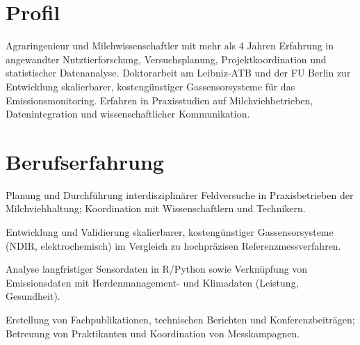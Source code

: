 \documentclass[10pt,a4paper]{article}
\begin{document}

\section*{Profil}
Agraringenieur und Milchwissenschaftler mit mehr als 4 Jahren Erfahrung in angewandter Nutztierforschung, Versuchsplanung, Projektkoordination und statistischer Datenanalyse. Doktorarbeit am Leibniz-ATB und der FU Berlin zur Entwicklung skalierbarer, kostengünstiger Gassensorsysteme für das Emissionsmonitoring. Erfahren in Praxisstudien auf Milchviehbetrieben, Datenintegration und wissenschaftlicher Kommunikation.

\section*{Berufserfahrung}

\begin{cvitems}

  \item Planung und Durchführung interdisziplinärer Feldversuche in Praxisbetrieben der Milchviehhaltung; Koordination mit Wissenschaftlern und Technikern.

  \item Entwicklung und Validierung skalierbarer, kostengünstiger Gassensorsysteme (NDIR, elektrochemisch) im Vergleich zu hochpräzisen Referenzmessverfahren.

  \item Analyse langfristiger Sensordaten in R/Python sowie Verknüpfung von Emissionsdaten mit Herdenmanagement- und Klimadaten (Leistung, Gesundheit).

  \item Erstellung von Fachpublikationen, technischen Berichten und Konferenzbeiträgen; Betreuung von Praktikanten und Koordination von Messkampagnen.

\end{cvitems}
\vspace{2pt}
\end{document}
